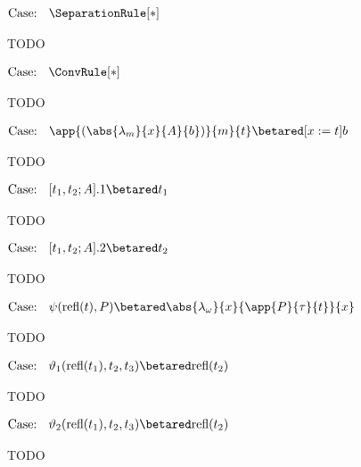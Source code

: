 $\text{Case: }\begin{array}{c} \SeparationRule[*] \end{array}$
\begin{proofcase}
    TODO
\end{proofcase}

$\text{Case: }\begin{array}{c} \ConvRule[*] \end{array}$
\begin{proofcase}
    TODO
\end{proofcase}



$\text{Case: }\begin{array}{c} \app{(\abs{\lambda_m}{x}{A}{b})}{m}{t} \betared [x := t]b \end{array}$
\begin{proofcase}
    TODO
\end{proofcase}

$\text{Case: }\begin{array}{c} [t_1, t_2; A].1 \betared t_1 \end{array}$
\begin{proofcase}
    TODO
\end{proofcase}

$\text{Case: }\begin{array}{c} [t_1, t_2; A].2 \betared t_2 \end{array}$
\begin{proofcase}
    TODO
\end{proofcase}

$\text{Case: }\begin{array}{c} \psi(\text{refl}(t),P) \betared \abs{\lambda_\omega}{x}{\app{P}{\tau}{t}}{x} \end{array}$
\begin{proofcase}
    TODO
\end{proofcase}

$\text{Case: }\begin{array}{c} \vartheta_1(\text{refl}(t_1), t_2, t_3) \betared \text{refl}(t_2) \end{array}$
\begin{proofcase}
    TODO
\end{proofcase}

$\text{Case: }\begin{array}{c} \vartheta_2(\text{refl}(t_1), t_2, t_3) \betared \text{refl}(t_2) \end{array}$
\begin{proofcase}
    TODO
\end{proofcase}

